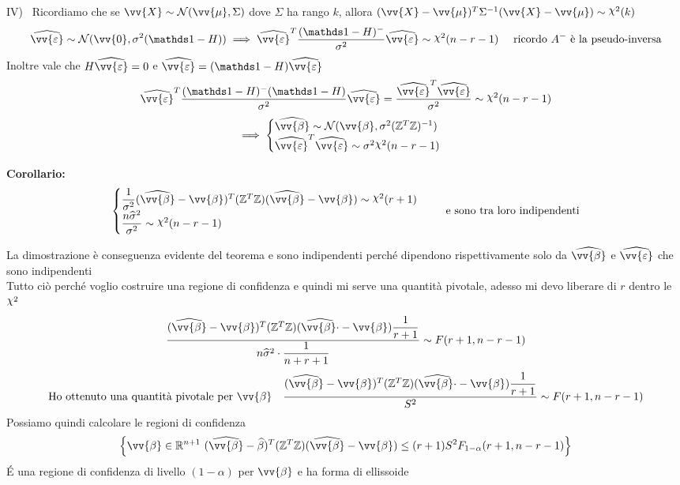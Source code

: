 \begin{Dim}
    IV) \ Ricordiamo che se $\vv{X}\sim \Nc(\vv{\mu},\Sigma)$ dove $\Sigma$ ha rango $k$, allora $(\vv{X}-\vv{\mu})^T \Sigma^{-1}(\vv{X}-\vv{\mu})\sim \Chi^2(k)$
    \[
    \hat{\vv{\eps}} \sim \Nc (\vv{0},\sigma^2 (\II -H)) \implies \hat{\vv{\eps}}^T \frac{(\II-H)^-}{\sigma^2} \hat{\vv{\eps}}\sim \Chi^2(n-r-1) \ \ \ \text{ ricordo } A^- \text{ è la pseudo-inversa}
    \]
    Inoltre vale che $H\hat{\vv{\eps}}=0 $ e $\hat{\vv{\eps}}= (\II-H)\hat{\vv{\eps}}$
    \[
    \hat{\vv{\eps}}^T \frac{(\II-H)^- (\II-H)}{\sigma^2} \hat{\vv{\eps}} = \frac{\hat{\vv{\eps}}^T\hat{\vv{\eps}}}{\sigma^2} \sim \Chi^2(n-r-1)
    \]
    \[
    \implies \begin{cases}
        \hat{\vv{\beta}}\sim \Nc (\vv{\beta}, \sigma^2(\ZZ^T\ZZ)^{-1}) \\  \hat{\vv{\eps}}^T\hat{\vv{\eps}} \sim \sigma^2 \Chi^2(n-r-1)
    \end{cases}
    \]
\end{Dim}

\phantom{}

\textbf{Corollario:}
\[
\begin{cases}
        \frac{1}{\sigma^2} (\hat{\vv{\beta}}-\vv{\beta})^T(\ZZ^T\ZZ)(\hat{\vv{\beta}}-\vv{\beta}) \sim \Chi^2(r+1)\\  \frac{n\hat{\sigma}^2}{\sigma^2} \sim  \Chi^2(n-r-1)
\end{cases} \ \ \  \text{ e sono tra loro indipendenti}
\]


La dimostrazione è conseguenza evidente del teorema e sono indipendenti perché dipendono rispettivamente solo da $\hat{\vv{\beta}}$ e $\hat{\vv{\eps}}$ che sono indipendenti\\

Tutto ciò perché voglio costruire una regione di confidenza e quindi mi serve una quantità pivotale, adesso mi devo liberare di $r$ dentro le $\Chi^2$
\[
\frac{(\hat{\vv{\beta}}-\vv{\beta})^T(\ZZ^T\ZZ)(\hat{\vv{\beta}\cdot}-\vv{\beta})\frac{1}{r+1}}{n\hat{\sigma}^2\cdot \frac{1}{n+r+1}} \sim F(r+1,n-r-1)
\]
\[
\text{Ho ottenuto una quantità pivotale per } \vv{\beta} \ \ \ \frac{(\hat{\vv{\beta}}-\vv{\beta})^T(\ZZ^T\ZZ)(\hat{\vv{\beta}\cdot}-\vv{\beta})\frac{1}{r+1}}{S^2} \sim F(r+1,n-r-1)
\]
Possiamo quindi calcolare le regioni di confidenza
\[
\OOO \vv{\beta}\in \R^{n+1} \ (\hat{\vv{\beta}}-\hat{\beta})^T (\ZZ^T\ZZ) (\hat{\vv{\beta}}-\vv{\beta}) \le (r+1) S^2 F_{1-\alpha} (r+1, n-r-1) \CCC
\]
É una regione di confidenza di livello $(1-\alpha)$ per $\vv{\beta}$ e ha forma di ellissoide

